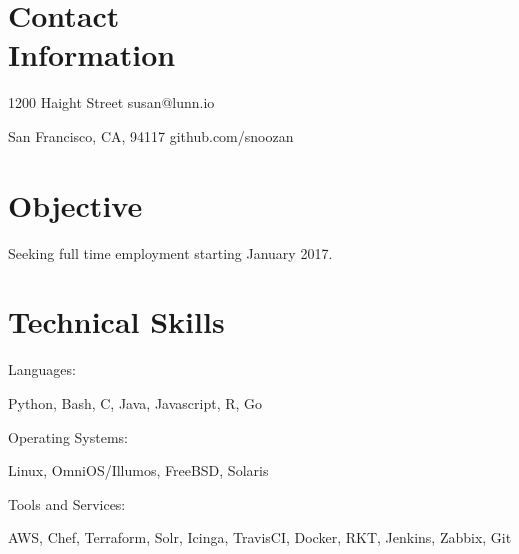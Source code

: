 \documentclass[a4paper,margin,line]{resume}
\begin{document}
\begin{resume}
\section{\mysidestyle Contact \\ Information}
	\begin{asparablank}
		\item 1200 Haight Street \hfill susan@lunn.io
		\item San Francisco, CA, 94117 \hfill github.com/snoozan
	\end{asparablank}

\section{\mysidestyle Objective}
	\begin{asparablank}
    	\item Seeking full time employment starting January 2017.
	\end{asparablank}

\section{\mysidestyle Technical Skills}
	\begin{compactdesc}
		\item[Languages: ] \begin{asparablank} { \small
			\item Python, Bash, C, Java, Javascript, R, Go
		} \end{asparablank}
		\item[Operating Systems: ] \begin{asparablank} { \small
            \item Linux, OmniOS/Illumos, FreeBSD, Solaris
		} \end{asparablank}
		\item[Tools and Services: ] \begin{asparablank} { \small
            \item AWS, Chef, Terraform, Solr, Icinga, TravisCI, Docker, RKT, Jenkins, Zabbix, Git
		} \end{asparablank}
	\end{compactdesc}


\end{resume}
\end{document}
